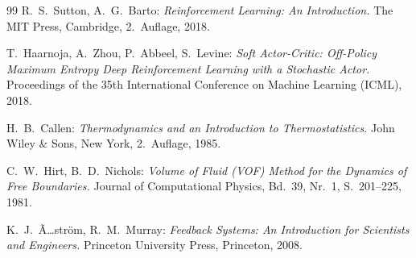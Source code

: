 ﻿\documentclass[12pt,a4paper]{article}
\theoremstyle{remark}
\begin{document}
\begin{thebibliography}{99}
	R.~S.~Sutton, A.~G.~Barto:
	\textit{Reinforcement Learning: An Introduction.}
	The MIT Press, Cambridge, 2.~Auflage, 2018.
	
	T.~Haarnoja, A.~Zhou, P.~Abbeel, S.~Levine:
	\textit{Soft Actor-Critic: Off-Policy Maximum Entropy Deep Reinforcement Learning
	with a Stochastic Actor.}
	Proceedings of the 35th International Conference on Machine Learning (ICML), 2018.
	
	H.~B.~Callen:
	\textit{Thermodynamics and an Introduction to Thermostatistics.}
	John Wiley \& Sons, New York, 2.~Auflage, 1985.
	
	C.~W.~Hirt, B.~D.~Nichols:
	\textit{Volume of Fluid (VOF) Method for the Dynamics of Free Boundaries.}
	Journal of Computational Physics, Bd.~39, Nr.~1, S.~201--225, 1981.
	
	K.~J.~Ã…ström, R.~M.~Murray:
	\textit{Feedback Systems: An Introduction for Scientists and Engineers.}
	Princeton University Press, Princeton, 2008.
	
	\end{thebibliography}
\end{document}
